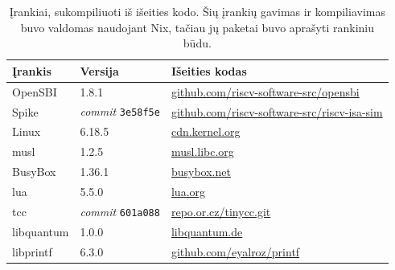 \begin{table}[h]
    \centering
    \begin{tabularx}{0.85\textwidth}{|l|Y{0.6}|Y{1.4}|}
    \hline
    \textbf{Įrankis} & \textbf{Versija} & \textbf{Išeities kodas} \\
    \hline
    OpenSBI & 1.8.1 &
        \href{https://github.com/riscv-software-src/opensbi/archive/refs/tags/v1.8.1.tar.gz}{github.com/riscv-software-src/opensbi} \\
    \hline
    Spike & \textit{commit} \texttt{3e58f5e} &
        \href{https://github.com/riscv-software-src/riscv-isa-sim/archive/3e58f5ef626fa76dd6675f1f78c6cd8470e18727.zip}{github.com/riscv-software-src/riscv-isa-sim} \\
    \hline
    Linux & 6.18.5 &
        \href{https://cdn.kernel.org/pub/linux/kernel/v6.x/linux-6.18.5.tar.xz}{cdn.kernel.org} \\
    \hline
    musl & 1.2.5 &
        \href{https://musl.libc.org/releases/musl-1.2.5.tar.gz}{musl.libc.org} \\
    \hline
    BusyBox & 1.36.1 &
        \href{https://busybox.net/downloads/busybox-1.36.1.tar.bz2}{busybox.net} \\
    \hline
    lua & 5.5.0 &
        \href{https://www.lua.org/ftp/lua-5.5.0.tar.gz}{lua.org} \\
    \hline
    tcc & \textit{commit} \texttt{601a088} &
        \href{https://repo.or.cz/tinycc.git/snapshot/601a0882148f11575367c5f2e54261cad9b00141.tar.gz}{repo.or.cz/tinycc.git} \\
    \hline
    libquantum & 1.0.0 &
        \href{http://www.libquantum.de/files/libquantum-1.0.0.tar.gz}{libquantum.de} \\
    \hline
    libprintf & 6.3.0 &
        \href{https://github.com/eyalroz/printf/archive/refs/tags/v6.3.0.tar.gz}{github.com/eyalroz/printf} \\
    \hline
    \end{tabularx}
    \caption{Įrankiai, sukompiliuoti iš išeities kodo. Šių įrankių gavimas ir kompiliavimas buvo valdomas naudojant Nix, tačiau jų paketai buvo aprašyti rankiniu būdu.}
    \label{tbl:irankiai-kompiliuoti}
\end{table}

